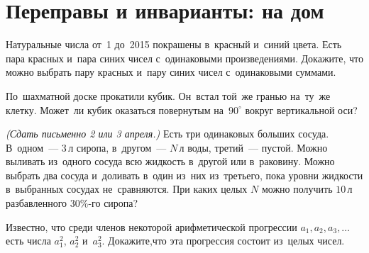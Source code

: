 
\section*{Переправы и инварианты: на дом}




\begin{problems}

Натуральные числа от~1 до~2015 покрашены в~красный и~синий цвета.
Есть пара красных и~пара синих чисел с~одинаковыми произведениями.
Докажите, что можно выбрать пару красных и~пару синих чисел с~одинаковыми
суммами.

По~шахматной доске прокатили кубик.
Он~встал той~же гранью на~ту~же клетку.
Может~ли кубик оказаться повернутым на~$90^\circ$ вокруг вертикальной оси?

\emph{(Сдать письменно 2 или 3 апреля.)}
Есть три одинаковых больших сосуда.
В~одном~--- $3\,\text{л}$ сиропа, в~другом~--- $N\,\text{л}$ воды,
третий~--- пустой.
Можно выливать из~одного сосуда всю жидкость в~другой или в~раковину.
Можно выбрать два сосуда и~доливать в~один из~них из~третьего, пока уровни
жидкости в~выбранных сосудах не~сравняются.
При каких целых $N$ можно получить $10\,\text{л}$ разбавленного $30\%$-го
сиропа?

Известно, что среди членов некоторой арифметической прогрессии
$a_1, a_2, a_3, \ldots$ есть числа $a_1^2$, $a_2^2$ и~$a_3^2$.
Докажите,что эта прогрессия состоит из~целых чисел.

\end{problems}

